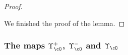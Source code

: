 \documentclass[12pt,a4paper]{amsart}
\def\abs#1{\left|{#1}\right|}
\def\DD{\nabla}
\numberwithin{equation}{section}
\theoremstyle{remark}
\def\ssign{\mathrm{Sign}}
\let\ytb=\ytableaushort
\newcommand{\tytb}[1]{{\tiny\ytb{#1}}}
\def\cOpp{\cO^{\prime\prime}}
\def\pUpsilon{\Upsilon^+}
\def\nUpsilon{\Upsilon^-}
\def\pcL{\cL^+}
\def\ncL{\cL^-}
\def\ncP{\cP^-}
\def\uptaup{\uptau^{\prime}}
\def\uptaupp{\uptau^{\prime\prime}}
\begin{document}
\begin{proof}
\begin{enumPF}
\begin{enumPF}
  \end{enumPF}
\end{enumPF}
  We finished the proof of the lemma.
\end{proof}

\subsubsection{The maps $\pUpsilon_{\cO}$, $\nUpsilon_{\cO}$ and $\Upsilon_{\cO}$}
\end{document}
